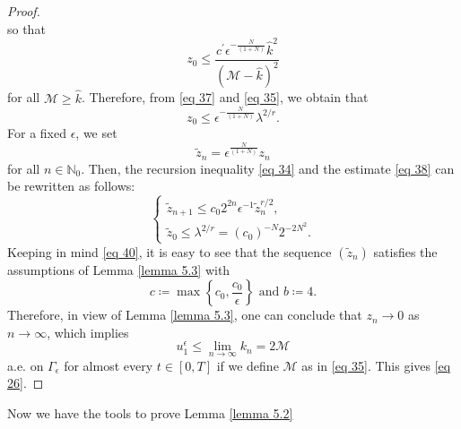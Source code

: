 \begin{proof}
\begin{equation}
\label{eq 36}
\end{equation}
so that
\begin{equation}
    z_{0} \leq \frac{c^{\prime} \epsilon^{-\frac{N}{(1+N)}} \hat{k}^{2}}{(\mathcal{M}-\hat{k})^{2}}
\label{eq 37}
\end{equation}
for all $\mathcal{M} \geq \hat{k}$. Therefore, from \eqref{eq 37} and \eqref{eq 35}, we obtain that
\begin{equation}
    z_{0} \leq \epsilon^{-\frac{N}{(1+N)}} \lambda^{2 / r}.
\label{eq 38}
\end{equation}
For a fixed $\epsilon$, we set
\begin{equation}
    \tilde{z}_{n}=\epsilon^{\frac{N}{(1+N)}} z_{n}
\label{eq 39}
\end{equation}
for all $n \in \mathbb{N}_{0}$. Then, the recursion inequality \eqref{eq 34} and the estimate \eqref{eq 38} can be rewritten as follows:
\begin{equation}
    \begin{cases}
        \tilde{z}_{n+1} \leq c_{0} 2^{2 n} \epsilon^{-1} \tilde{z}_{n}^{r / 2}, \\
        \tilde{z}_{0} \leq \lambda^{2 / r}=\left(c_{0}\right)^{-N} 2^{-2 N^{2}}.
    \end{cases}
\label{eq 40}
\end{equation}
Keeping in mind \eqref{eq 40}, it is easy to see that the sequence $\left(\tilde{z}_{n}\right)$ satisfies the assumptions of Lemma \eqref{lemma 5.3} with
$$
    c\coloneqq \max \left\{c_{0}, \frac{c_{0}}{\epsilon}\right\} \text { and } b\coloneqq 4.
$$
Therefore, in view of Lemma \eqref{lemma 5.3}, one can conclude that $z_{n} \rightarrow 0$ as $n \rightarrow \infty$, which implies
$$
    u_{1}^{\epsilon} \leq \lim _{n \rightarrow \infty} k_{n}=2 \mathcal{M}
$$
a.e. on $\Gamma_{\epsilon}$ for almost every $t \in[0, T]$ if we define $\mathcal{M}$ as in \eqref{eq 35}. This gives \eqref{eq 26}.
\end{proof}
Now we have the tools to prove Lemma \eqref{lemma 5.2}
